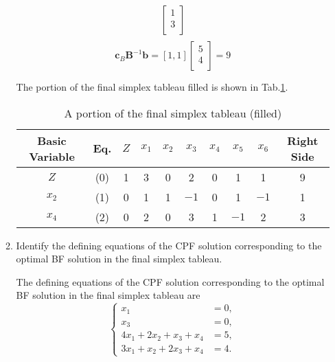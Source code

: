 \documentclass[a4paper]{article}
\begin{document}
\begin{enumerate}
\begin{enumerate}
\begin{solution}
\begin{equation*}
\begin{aligned}
\begin{bmatrix}
		1\\
		3\\
		\end{bmatrix}\\
		\end{aligned}		
		\end{equation*}
		\begin{equation*}
		\mathbf{c}_B\mathbf{B}^{-1}\mathbf{b}
		=[1,1]\begin{bmatrix}
		5\\
		4\\
		\end{bmatrix}
		=9
		\end{equation*}
		
		The portion of the final simplex tableau filled is shown in Tab.\ref{tab6}.
		\begin{table}[h]
			\centering
			\caption{A portion of the final simplex tableau (filled)}
			\label{tab6}
			\begin{tabular}{cccccccccc}
				\toprule[1.5pt]
				Basic Variable    &Eq.  &$Z$  &$x_1$&$x_2$&$x_3$&$x_4$&$x_5$&$x_6$&Right Side\\
				\midrule[0.5pt]
				$Z$     &(0)  &1  &3      &0      &2       &0       &1       &1       &9\\
				$x_2$  &(1)  &0  &1      & 1     &$-1$     &0       &1       &$-1$      &1\\
				$x_4$  &(2)  &0  &2      &0      &3      &1       &$-1$      &2       &3\\
				
				\bottomrule[1.5pt]
			\end{tabular}
		\end{table}		
	\end{solution}
	
	\vspace*{-0.2cm}
	\item Identify the defining equations of the CPF solution corresponding to the optimal BF solution in the final simplex tableau.
	\begin{solution}
		
		The defining equations of the CPF solution corresponding to the optimal BF solution in the final simplex tableau are
		\begin{equation*}
		\left\{\begin{aligned}
		x_1&=0,\\
		x_3&=0,\\
		4x_1+2x_2+x_3+x_4&=5,\\
		3x_1+x_2+2x_3+x_4&=4.
		\end{aligned}
		\right.
		\end{equation*}
		
	\end{solution}
	
\end{enumerate}


\end{enumerate}
%  
\end{document}
